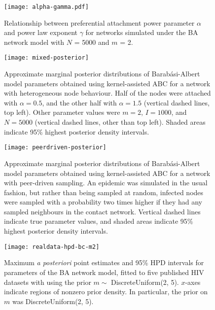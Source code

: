 \begin{figure}[ht]
  \centering
  \texttt{[image: alpha-gamma.pdf]}
  \caption{
      Relationship between preferential attachment power parameter $\alpha$
      and power law exponent $\gamma$ for networks simulated under the BA
      network model with $N$ = 5000 and $m$ = 2.
  }
  \label{fig:gamma}
\end{figure}

\begin{figure}[ht]
    \centering
    \texttt{[image: mixed-posterior]}
    \caption[Approximate marginal posterior distributions of BA model
        parameters obtained using kernel-assisted ABC for a network with heterogeneous
        node behaviour.]
    {
        Approximate marginal posterior distributions of Barab\'asi-Albert
        model parameters obtained using kernel-assisted ABC for a network with
        heterogeneous node behaviour. Half of the nodes were attached with
        $\alpha = 0.5$, and the other half with $\alpha = 1.5$ (vertical
        dashed lines, top left). Other parameter values were $m = 2$, $I =
        1000$, and $N = 5000$ (vertical dashed lines, other than top left).
        Shaded areas indicate 95\% highest posterior density intervals.
    }
    \label{fig:mixed}
\end{figure}

\begin{figure}[ht]
    \centering
    \texttt{[image: peerdriven-posterior]}
    \caption[Approximate marginal posterior distributions of Barab\'asi-Albert
        model parameters obtained using kernel-assisted ABC for a network with
        peer-driven sampling.]
    {
        Approximate marginal posterior distributions of Barab\'asi-Albert
        model parameters obtained using kernel-assisted ABC for a network with
        peer-driven sampling. An epidemic was simulated in the usual fashion,
        but rather than being sampled at random, infected nodes were sampled
        with a probability two times higher if they had any sampled neighbours
        in the contact network. Vertical dashed lines indicate true parameter
        values, and shaded areas indicate 95\% highest posterior density
        intervals.
    }
    \label{fig:peerdriven}
\end{figure}

\begin{figure}[ht]
  \texttt{[image: realdata-hpd-bc-m2]}
  \vspace{8pt}
  \caption[
      Maximum \textit{a posteriori} point estimates and 95\% HPD intervals for
      parameters of the BA network model, fitted to five published HIV datasets
      with  using the prior $m \sim DiscreteUniform(2, 5)$.
  ]{
      Maximum \textit{a posteriori} point estimates and 95\% HPD intervals for
      parameters of the BA network model, fitted to five published HIV datasets
      with  using the prior $m \sim$ DiscreteUniform(2, 5).
      $x$-axes indicate regions of nonzero prior density. In particular, the
      prior on $m$ was DiscreteUniform(2, 5).
  }
  \label{fig:abchpdm2}
\end{figure}

